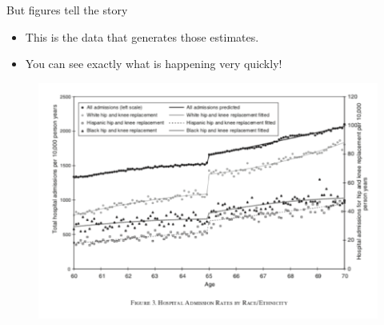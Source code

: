 \documentclass[aspectratio=169]{beamer}
\begin{document}
\begin{frame}[fragile]{But figures tell the story}

\begin{multicols}{2}	
	\begin{itemize}
		\item This is the data that generates those estimates.
		\item You can see exactly what is happening very quickly!
	\end{itemize}
	\begin{figure}
		\centering
		\includegraphics[width=\linewidth]{img/line}
	\end{figure}
\end{multicols}
\end{frame}
\end{document}
